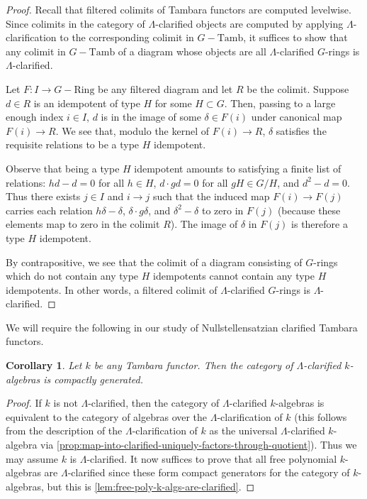 \documentclass[11pt,dvipsnames]{amsart}
\newtheorem{corollary}[theorem]{Corollary}
\theoremstyle{BoldRemark}
\newcommand{\Tamb}{\mathrm{Tamb}}
\newcommand{\Ring}{\mathrm{Ring}}
\begin{document}
\begin{proof}
	Recall that filtered colimits of Tambara functors are computed levelwise. Since colimits in the category of $\Lambda$-clarified objects are computed by applying $\Lambda$-clarification to the corresponding colimit in $G {-} \Tamb$, it suffices to show that any colimit in $G {-} \Tamb$ of a diagram whose objects are all $\Lambda$-clarified $G$-rings is $\Lambda$-clarified.
	
	Let $F : I \rightarrow G {-} \Ring$ be any filtered diagram and let $R$ be the colimit. Suppose $d \in R$ is an idempotent of type $H$ for some $H \subset G$. Then, passing to a large enough index $i \in I$, $d$ is in the image of some $\delta \in F(i)$ under canonical map $F(i) \rightarrow R$. We see that, modulo the kernel of $F(i) \rightarrow R$, $\delta$ satisfies the requisite relations to be a type $H$ idempotent. 
	
	Observe that being a type $H$ idempotent amounts to satisfying a finite list of relations: $hd - d = 0$ for all $h \in H$, $d \cdot gd = 0$ for all $gH \in G/H$, and $d^2 - d = 0$. Thus there exists $j \in I$ and $i \rightarrow j$ such that the induced map $F(i) \rightarrow F(j)$ carries each relation $h \delta - \delta$, $\delta \cdot g \delta$, and $\delta^2 - \delta$ to zero in $F(j)$ (because these elements map to zero in the colimit $R$). The image of $\delta$ in $F(j)$ is therefore a type $H$ idempotent.
	
	By contrapositive, we see that the colimit of a diagram consisting of $G$-rings which do not contain any type $H$ idempotents cannot contain any type $H$ idempotents. In other words, a filtered colimit of $\Lambda$-clarified $G$-rings is $\Lambda$-clarified.
\end{proof}

We will require the following in our study of Nullstellensatzian clarified Tambara functors.

\begin{corollary}\label{cor:Lambda-clarified-is-compactly-generated}
	Let $k$ be any Tambara functor. Then the category of $\Lambda$-clarified $k$-algebras is compactly generated.
\end{corollary}

\begin{proof}
	If $k$ is not $\Lambda$-clarified, then the category of $\Lambda$-clarified $k$-algebras is equivalent to the category of algebras over the $\Lambda$-clarification of $k$ (this follows from the description of the $\Lambda$-clarification of $k$ as the universal $\Lambda$-clarified $k$-algebra via \cref{prop:map-into-clarified-uniquely-factors-through-quotient}). Thus we may assume $k$ is $\Lambda$-clarified. It now suffices to prove that all free polynomial $k$-algebras are $\Lambda$-clarified since these form compact generators for the category of $k$-algebras, but this is \cref{lem:free-poly-k-algs-are-clarified}.
\end{proof}
\end{document}
